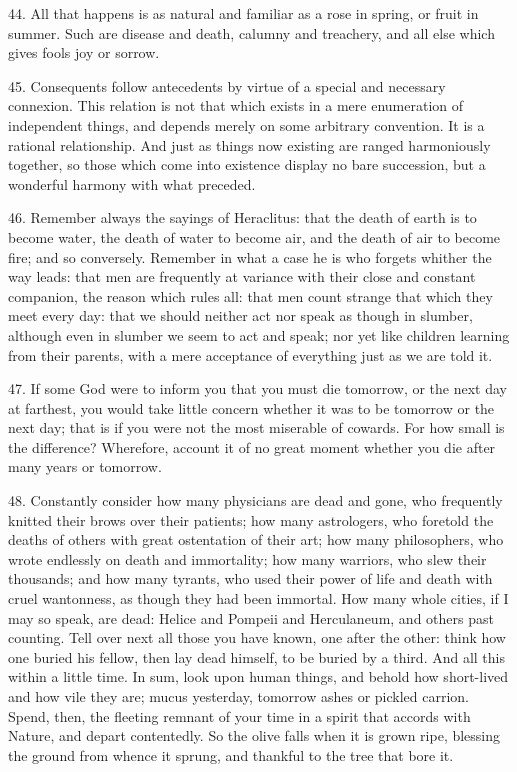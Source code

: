 \documentclass{book}
\begin{document}
44. All that happens is as natural and familiar as a rose in spring,
or fruit in summer. Such are disease and death, calumny and treachery,
and all else which gives fools joy or sorrow.

45. Consequents follow antecedents by virtue of a special and
necessary connexion. This relation is not that which exists in a mere
enumeration of independent things, and depends merely on some
arbitrary convention. It is a rational relationship. And just as
things now existing are ranged harmoniously together, so those which
come into existence display no bare succession, but a wonderful
harmony with what preceded.

46. Remember always the sayings of Heraclitus: that the death of earth
is to become water, the death of water to become air, and the death of
air to become fire; and so conversely. Remember in what a case he is
who forgets whither the way leads: that men are frequently at variance
with their close and constant companion, the reason which rules all:
that men count strange that which they meet every day: that we should
neither act nor speak as though in slumber, although even in slumber
we seem to act and speak; nor yet like children learning from their
parents, with a mere acceptance of everything just as we are told it.

47. If some God were to inform you that you must die tomorrow, or the
next day at farthest, you would take little concern whether it was to
be tomorrow or the next day; that is if you were not the most
miserable of cowards. For how small is the difference? Wherefore,
account it of no great moment whether you die after many years or
tomorrow.

48. Constantly consider how many physicians are dead and gone, who
frequently knitted their brows over their patients; how many
astrologers, who foretold the deaths of others with great ostentation
of their art; how many philosophers, who wrote endlessly on death and
immortality; how many warriors, who slew their thousands; and how many
tyrants, who used their power of life and death with cruel wantonness,
as though they had been immortal. How many whole cities, if I may so
speak, are dead: Helice and Pompeii and Herculaneum, and others past
counting. Tell over next all those you have known, one after the
other: think how one buried his fellow, then lay dead himself, to be
buried by a third. And all this within a little time. In sum, look
upon human things, and behold how short-lived and how vile they are;
mucus yesterday, tomorrow ashes or pickled carrion. Spend, then, the
fleeting remnant of your time in a spirit that accords with Nature,
and depart contentedly. So the olive falls when it is grown ripe,
blessing the ground from whence it sprung, and thankful to the tree
that bore it.
\end{document}
